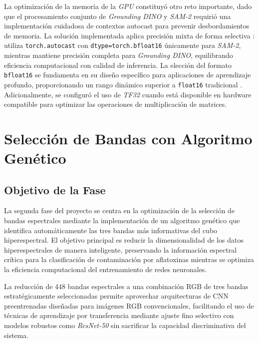 La optimización de la memoria de la \emph{GPU} constituyó otro reto importante, dado que el procesamiento conjunto de \emph{Grounding DINO} y \emph{SAM-2} requirió una implementación cuidadosa de contextos autocast para prevenir desbordamientos de memoria. La solución implementada aplica precisión mixta de forma selectiva \cite{micikevicius2018mixedprecisiontraining}: utiliza \texttt{torch.autocast} con \texttt{dtype=torch.bfloat16} únicamente para \emph{SAM-2}, mientras mantiene precisión completa para \emph{Grounding DINO}, equilibrando eficiencia computacional con calidad de inferencia. La elección del formato \texttt{bfloat16} se fundamenta en su diseño específico para aplicaciones de aprendizaje profundo, proporcionando un rango dinámico superior a \texttt{float16} tradicional \cite{8877411}. Adicionalmente, se configuró el uso de \emph{TF32} cuando está disponible en hardware compatible para optimizar las operaciones de multiplicación de matrices.

\section{Selección de Bandas con Algoritmo Genético}

\subsection{Objetivo de la Fase}
La segunda fase del proyecto se centra en la optimización de la selección de bandas espectrales mediante la implementación de un algoritmo genético que identifica automáticamente las tres bandas más informativas del cubo hiperespectral. El objetivo principal es reducir la dimensionalidad de los datos hiperespectrales de manera inteligente, preservando la información espectral crítica para la clasificación de contaminación por aflatoxinas mientras se optimiza la eficiencia computacional del entrenamiento de redes neuronales.

\vspace{5mm}

La reducción de 448 bandas espectrales a una combinación RGB de tres bandas estratégicamente seleccionadas permite aprovechar arquitecturas de CNN preentrenadas diseñadas para imágenes RGB convencionales, facilitando el uso de técnicas de aprendizaje por transferencia mediante ajuste fino selectivo \cite{NEURIPS2019_9015} con modelos robustos como \emph{ResNet-50} \cite{he2016deep} sin sacrificar la capacidad discriminativa del sistema.

